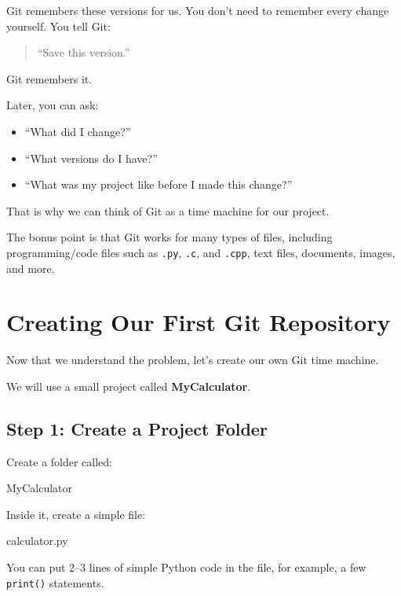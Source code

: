 \documentclass[11pt,a4paper]{article}
\begin{document}
Git remembers these versions for us. You don't need to remember every change yourself. You tell Git:

\begin{quote}
``Save this version.''
\end{quote}

Git remembers it.

Later, you can ask:

\begin{itemize}
    \item ``What did I change?''
    \item ``What versions do I have?''
    \item ``What was my project like before I made this change?''
\end{itemize}

That is why we can think of Git as a time machine for our project.

The bonus point is that Git works for many types of files, including programming/code files such as \texttt{.py}, \texttt{.c}, and \texttt{.cpp}, text files, documents, images, and more.

\section{Creating Our First Git Repository}

Now that we understand the problem, let's create our own Git time machine.

We will use a small project called \textbf{MyCalculator}.

\subsection{Step 1: Create a Project Folder}

Create a folder called:

\begin{code}
MyCalculator
\end{code}

Inside it, create a simple file:

\begin{code}
calculator.py
\end{code}

You can put 2--3 lines of simple Python code in the file, for example, a few \texttt{print()} statements.
\end{document}
